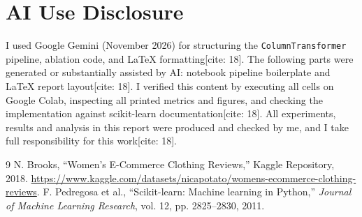 \documentclass[10pt,twocolumn,a4paper]{IEEEtran}
\begin{document}
\section*{AI Use Disclosure}
I used Google Gemini (November 2026) for structuring the \texttt{ColumnTransformer} pipeline, ablation code, and LaTeX formatting[cite: 18]. The following parts were generated or substantially assisted by AI: notebook pipeline boilerplate and LaTeX report layout[cite: 18]. I verified this content by executing all cells on Google Colab, inspecting all printed metrics and figures, and checking the implementation against scikit-learn documentation[cite: 18]. All experiments, results and analysis in this report were produced and checked by me, and I take full responsibility for this work[cite: 18].

\begin{thebibliography}{9}
N. Brooks, ``Women's E-Commerce Clothing Reviews,'' Kaggle Repository, 2018. \url{https://www.kaggle.com/datasets/nicapotato/womens-ecommerce-clothing-reviews}.
F. Pedregosa et al., ``Scikit-learn: Machine learning in Python,'' \textit{Journal of Machine Learning Research}, vol. 12, pp. 2825--2830, 2011.
\end{thebibliography}
\end{document}
